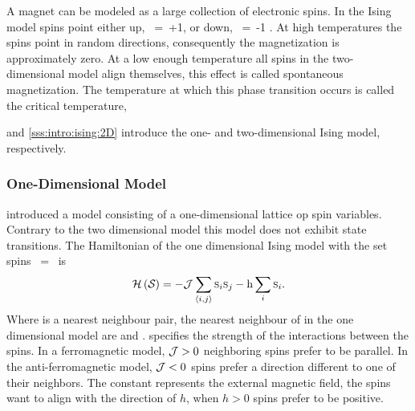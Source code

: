 A magnet can be modeled as a large collection of electronic spins. In the Ising model spins point either up, \mbox{\spin{} = +1}, or down, \mbox{\spin{} = -1} \cite{strogatz2014nonlinear}. At high temperatures the spins point in random directions, consequently the magnetization is approximately zero. At a low enough temperature all spins in the two-dimensional model align themselves, this effect is called spontaneous magnetization. The temperature at which this phase transition occurs is called the critical temperature, \criticalTemperature \cite{cai20011Handout}

 and \ref{sss:intro:ising:2D} introduce the one- and two-dimensional Ising model, respectively. 

\subsubsection{One-Dimensional Model}
	\label{sss:intro:ising:1D}
	\textcite{ising1925beitrag} introduced a model consisting of a one-dimensional lattice op spin variables. Contrary to the two dimensional model this model does not exhibit state transitions. The Hamiltonian of the one dimensional Ising model with the set spins \mbox{\configuration{} = \spinset} is
	\begin{equation}\label{eq:intro:ising:1D:hamiltonian}
		\mathcal{H}\left(\mathcal{S}_{} \right) = - \mathcal{J} \sum_{\left\langle i, j\right\rangle}\textsc{s}_{i}\textsc{s}_{j} - \mathrm{h} \sum_{i} \textsc{s}_{i}.
	\end{equation}
	Where  is a nearest neighbour pair, the nearest neighbour of  in the one dimensional model are  and . \interactionStrength specifies the strength of the interactions between the spins. In a ferromagnetic model, \mbox{$\mathcal{J} > 0$} neighboring spins prefer to be parallel. In the anti-ferromagnetic model, \mbox{$\mathcal{J} < 0$} spins prefer a direction different to one of their neighbors. The constant \magneticMoment represents the external magnetic field, the spins want to align with the direction of $h$, \ie when \mbox{$h > 0$} spins prefer to be positive. 

